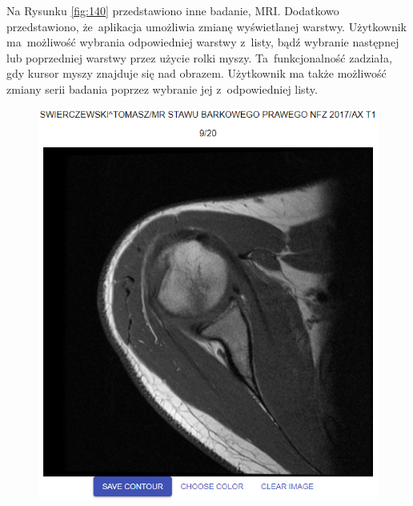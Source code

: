 \documentclass[a4paper,11pt,twoside,openright]{report}
\theoremstyle{definition}
\begin{document}
Na Rysunku \ref{fig:140} przedstawiono inne badanie, MRI. Dodatkowo przedstawiono,
że~aplikacja umożliwia zmianę wyświetlanej warstwy. Użytkownik ma~możliwość wybrania
odpowiedniej warstwy z~listy, bądź wybranie następnej lub poprzedniej warstwy przez użycie
rolki myszy. Ta~funkcjonalność zadziała, gdy kursor myszy znajduje się nad obrazem.
Użytkownik ma także możliwość zmiany serii badania poprzez wybranie jej z~odpowiedniej listy.

\bigskip

\begin{figure}[h!]
\begin{center}
	\begin{center}
		\includegraphics[width=1.0\textwidth]{141}
	\end{center}
	\endminipage\hfill
	\begin{center}

\end{center}
\end{center}
\end{figure}
\end{document}
